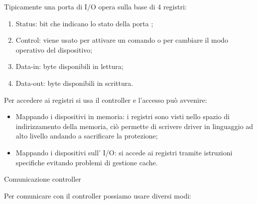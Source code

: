\documentclass[
]{article}
\providecommand{\tightlist}{%
  \setlength{\itemsep}{0pt}\setlength{\parskip}{0pt}}
\begin{document}
{Tipicamente una porta di I/O opera sulla base di 4 registri: }

{}

\begin{enumerate}
\tightlist
\item
  {Status: bit che indicano lo stato della porta ;}
\end{enumerate}

{}

\begin{enumerate}
\setcounter{enumi}{1}
\tightlist
\item
  {Control: viene usato per attivare un comando o per cambiare il modo
  operativo del dispositivo;}
\end{enumerate}

{}

\begin{enumerate}
\setcounter{enumi}{2}
\tightlist
\item
  {Data-in: byte disponibili in lettura;}
\end{enumerate}

{}

\begin{enumerate}
\setcounter{enumi}{3}
\tightlist
\item
  {Data-out: byte disponibili in scrittura.}
\end{enumerate}

{}

{Per accedere ai registri si usa il controller e l'accesso può
avvenire:}

{}

\begin{itemize}
\tightlist
\item
  {Mappando i dispositivi in memoria: i registri sono visti nello spazio
  di indirizzamento della memoria, ciò permette di scrivere driver in
  linguaggio ad alto livello andando a sacrificare la protezione;}
\end{itemize}

{}

\begin{itemize}
\tightlist
\item
  {Mappando i dispositivi sull' I/O: si accede ai registri tramite
  istruzioni specifiche evitando problemi di gestione cache.}
\end{itemize}

{}

{Comunicazione controller}

{Per comunicare con il controller possiamo usare diversi modi:}
\end{document}
